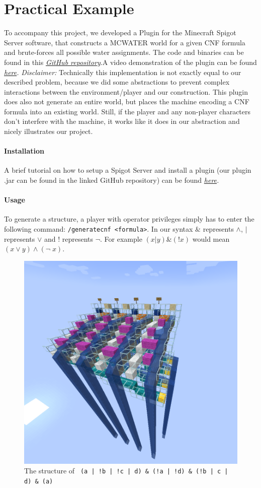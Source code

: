 \section{Practical Example}


To accompany this project, we developed a Plugin for the Minecraft Spigot Server software, that constructs a MCWATER world for a given CNF formula and brute-forces all possible water assignments. The code and binaries can be found in this \textit{\href{https://github.com/JonathanDotExe/minecraft-water-problem}{GitHub repository}}.\newline A video demonstration of the plugin can be found \textit{\href{https://www.youtube.com/watch?v=n2hz7z1Y2ew}{here}.}
\newline
\newline \emph{Disclaimer: } Technically this implementation is not exactly equal to our described problem, because we did some abstractions to prevent complex interactions between the environment/player and our construction. This plugin does also not generate an entire world, but places the machine encoding a CNF formula into an existing world. Still, if the player and any non-player characters don't interfere with the machine, it works like it does in our abstraction and nicely illustrates our project.

\paragraph{Installation}
A brief tutorial on how to setup a Spigot Server and install a plugin (our plugin .jar can be found in the linked GitHub repository) can be found \textit{\href{https://www.spigotmc.org/wiki/spigot-installation/}{here}.}

\paragraph{Usage}
To generate a structure, a player with operator privileges simply has to enter the following command: \verb|/generatecnf <formula>|. In our syntax $\&$ represents $\wedge$, $\vert$ represents $\vee$ and ! represents $\neg$. For example $(x | y) \& (!x)$ would mean $(x \vee y) \wedge (\neg \; x)$.

\begin{figure}[h]
    \centering
    \includegraphics[width=.5\linewidth]{images/big_example.png}
    \cprotect\caption{The structure of \verb+ (a | !b | !c | d) & (!a | !d) & (!b | c | d) & (a)+}
    \label{fig:small-example2}
\end{figure}

